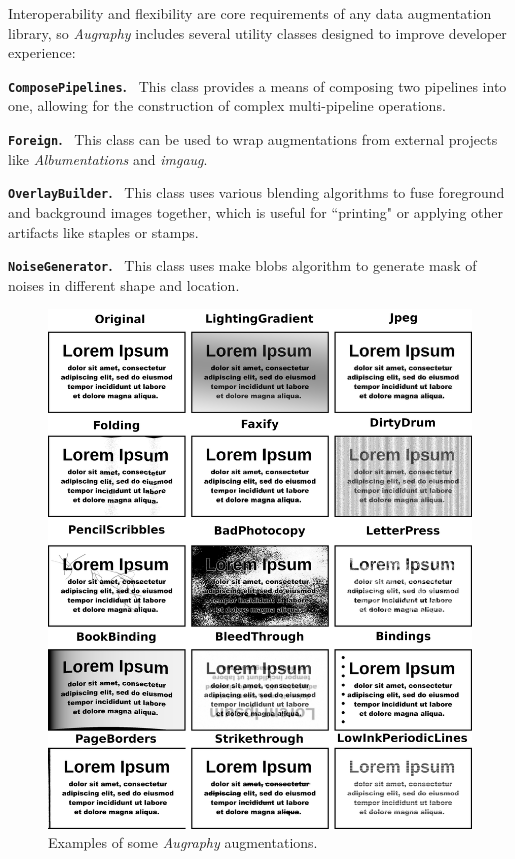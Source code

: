 \documentclass[runningheads]{llncs}
\begin{document}
\smallskip
Interoperability and flexibility are core requirements of any data augmentation library, so \emph{Augraphy} includes several utility classes designed to improve developer experience:

\noindent\textbf{\texttt{ComposePipelines}.} ~This class provides a means of composing two pipelines into one, allowing for the construction of complex multi-pipeline operations.

\smallskip
\noindent\textbf{\texttt{Foreign}.} ~This class can be used to wrap augmentations from external projects like \emph{Albumentations} and \emph{imgaug}.

\smallskip
\noindent\textbf{\texttt{OverlayBuilder}.} ~This class uses various blending algorithms to fuse foreground and background images together, which is useful for ``printing" or applying other artifacts like staples or stamps.

\smallskip
\noindent\textbf{\texttt{NoiseGenerator}.} ~This class uses make blobs algorithm to generate mask of noises in different shape and location.

\begin{figure}
\includegraphics[width=\textwidth]{figures/augmentation-matrix.png}
\caption{Examples of some \emph{Augraphy} augmentations.} \label{fig2}
\end{figure}
\end{document}
